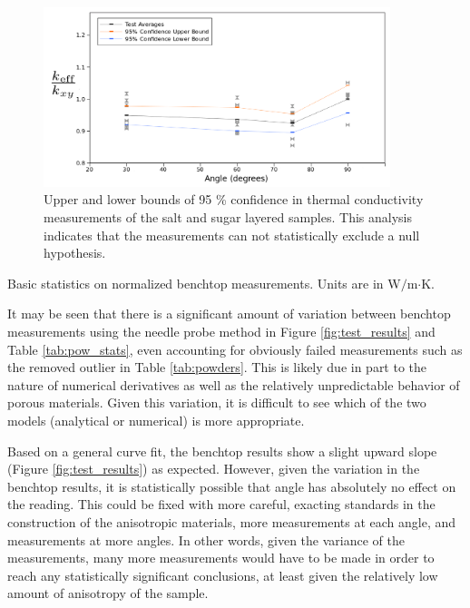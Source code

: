 \begin{figure}[h]
\centering
\includegraphics[width=0.9\textwidth]{fig/test_results_confidence.png}
\caption{Upper and lower bounds of 95 \% confidence in thermal conductivity measurements of the salt and sugar layered samples. This analysis 
indicates that the measurements can not statistically exclude a null hypothesis.}
\label{fig:test_confidence}
\end{figure}

\begin{table}[h]
\centering
\caption{Basic statistics on normalized benchtop measurements.  Units are in W\(/\)m\(\cdot\)K.}

\label{tab:pow_stats}
\end{table}


It may be seen that there is a significant amount of variation between
benchtop measurements using the needle probe method in Figure \ref{fig:test_results} and Table \ref{tab:pow_stats}, even accounting for obviously failed measurements such as the removed outlier in Table \ref{tab:powders}.
This is likely due in part to the nature of numerical derivatives as well as the relatively
unpredictable behavior of porous materials. Given
this variation, it is difficult to see which of the two models (analytical or numerical) is more appropriate.

Based on a general curve fit, the benchtop results show a slight upward slope (Figure \ref{fig:test_results}) as
expected. However, given the variation in the benchtop results, it is statistically
possible that angle has absolutely no effect on the reading. This could be fixed
with more careful, exacting standards in the construction of the anisotropic
materials, more measurements at each angle, and measurements at more angles.
In other words, given the variance of the measurements, many more measurements
would have to be made in order to reach any statistically significant
conclusions, at least given the relatively low amount of anisotropy of the sample.


